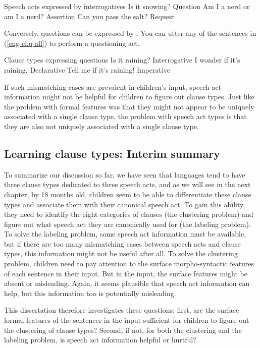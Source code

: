 Speech acts expressed by interrogatives 
\bxl Is it snowing? \hfill Question
\ex \label{eng-cl:int-asst} Am I a nerd or am I a nerd? \hspace*{\fill} Assertion
\ex\label{eng-cl:int-req} Can you pass the salt? \hfill Request
\exl
\eex

Conversely, questions can be expressed by \diis{}. You can utter any of the sentences in (\ref{eng-cl:q-all}) to perform a questioning act. 


Clause types expressing questions
\bxl
Is it raining? \hfill Interrogative
\ex I wonder if it's raining. \hfill Declarative
\ex Tell me if it's raining! \hfill Imperative
\exl
\eex

If such mismatching cases are prevalent in children's input, speech act information might not be helpful for children to figure out clause types. Just like the problem with formal features was that they might not appear to be uniquely associated with a single clause type, the problem with speech act types is that they are also not uniquely associated with a single clause type.


\subsection{Learning clause types: Interim summary}
\label{sec:intro:hypo}

To summarize our discussion so far, we have seen that languages tend to have three clause types dedicated to three speech acts, and as we will see in the next chapter, by 18 months old, children seem to be able to differentiate these clause types and associate them with their canonical speech act. To gain this ability, they need to identify the right categories of clauses (the clustering problem) and figure out what speech act they are canonically used for (the labeling problem). To solve the labeling problem, some speech act information must be available, but if there are too many mismatching cases between speech acts and clause types, this information might not be useful after all. To solve the clustering problem, children need to pay attention to the surface morpho-syntactic features of each sentence in their input. But in the input, the surface features might be absent or misleading. Again, it seems plausible that speech act information can help, but this information too is potentially misleading.

This dissertation therefore investigates these questions: first, are the surface formal features of the sentences in the input sufficient for children to figure out the clustering of clause types? Second, if not, for both the clustering and the labeling problem, is speech act information helpful or hurtful? 

